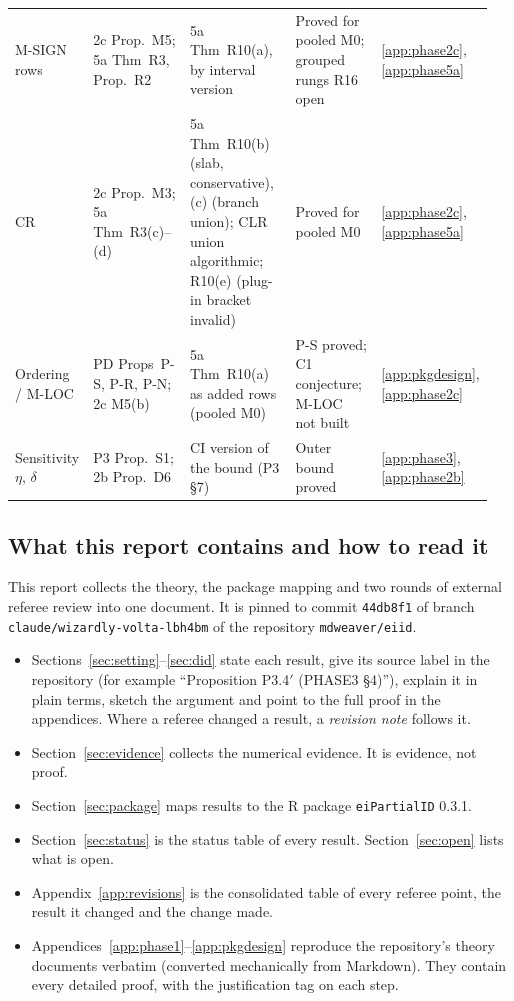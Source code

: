 {\begin{longtable}{@{}L{0.13\linewidth}L{0.24\linewidth}L{0.29\linewidth}L{0.22\linewidth}L{0.07\linewidth}@{}}
M-SIGN rows & 2c Prop.~M5; 5a Thm~R3, Prop.~R2 & 5a Thm~R10(a), by interval version & Proved for pooled M0; grouped rungs R16 open & \ref{app:phase2c}, \ref{app:phase5a} \\
CR & 2c Prop.~M3; 5a Thm~R3(c)--(d) & 5a Thm~R10(b) (slab, conservative), (c) (branch union); CLR union algorithmic; R10(e) (plug-in bracket invalid) & Proved for pooled M0 & \ref{app:phase2c}, \ref{app:phase5a} \\
Ordering / M-LOC & PD Props~P-S, P-R, P-N; 2c M5(b) & 5a Thm~R10(a) as added rows (pooled M0) & P-S proved; C1 conjecture; M-LOC not built & \ref{app:pkgdesign}, \ref{app:phase2c} \\
Sensitivity $\eta$, $\delta$ & P3 Prop.~S1; 2b Prop.~D6 & CI version of the bound (P3 \S7) & Outer bound proved & \ref{app:phase3}, \ref{app:phase2b} \\
\bottomrule
\end{longtable}
}

\subsection{What this report contains and how to read it}

This report collects the theory, the package mapping and two rounds of
external referee review into one document. It is pinned to commit
\texttt{44db8f1} of branch \texttt{claude/wizardly-volta-lbh4bm} of the
repository \texttt{mdweaver/eiid}.

\begin{itemize}[nosep]
\item Sections~\ref{sec:setting}--\ref{sec:did} state each result, give its
source label in the repository (for example ``Proposition P3.4$'$ (PHASE3
\S4)''), explain it in plain terms, sketch the argument and point to the full
proof in the appendices. Where a referee changed a result, a \emph{revision
note} follows it.
\item Section~\ref{sec:evidence} collects the numerical evidence. It is
evidence, not proof.
\item Section~\ref{sec:package} maps results to the R package
\texttt{eiPartialID} 0.3.1.
\item Section~\ref{sec:status} is the status table of every result.
Section~\ref{sec:open} lists what is open.
\item Appendix~\ref{app:revisions} is the consolidated table of every referee
point, the result it changed and the change made.
\item Appendices~\ref{app:phase1}--\ref{app:pkgdesign} reproduce the
repository's theory documents verbatim (converted mechanically from Markdown).
They contain every detailed proof, with the justification tag on each step.
\end{itemize}

